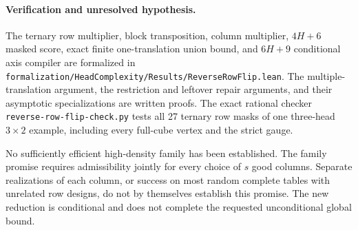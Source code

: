 \documentclass[11pt]{article}
\begin{document}
\paragraph{Verification and unresolved hypothesis.}
The ternary row multiplier, block transposition, column multiplier,
$4H+6$ masked score, exact finite one-translation union bound, and
$6H+9$ conditional axis compiler are formalized in
\texttt{formalization/HeadComplexity/Results/ReverseRowFlip.lean}.
The multiple-translation argument, the restriction and leftover
repair arguments, and their asymptotic specializations are written
proofs. The exact rational checker
\texttt{reverse-row-flip-check.py} tests all 27 ternary row masks of
one three-head $3\times2$ example, including every full-cube
vertex and the strict gauge.

No sufficiently efficient high-density family has been established.
The family promise requires admissibility jointly for every choice of
$s$ good columns. Separate realizations of each column, or success on
most random complete tables with unrelated row designs, do not by
themselves establish this promise. The new reduction is conditional
and does not complete the requested unconditional global bound.
\end{document}
